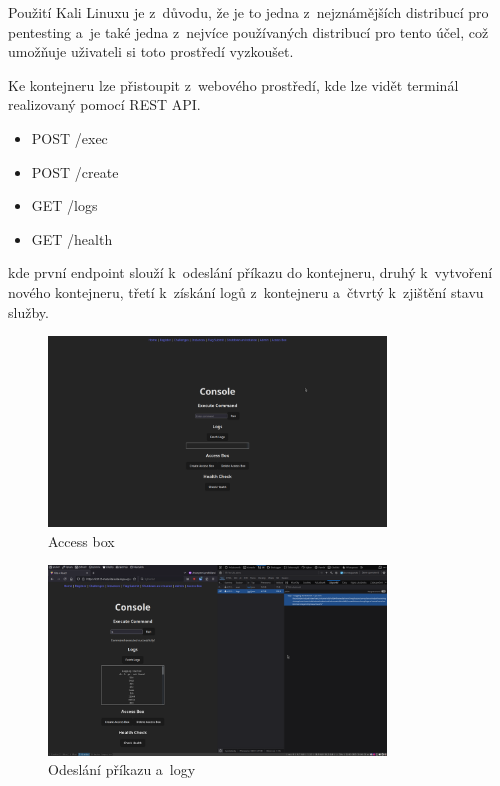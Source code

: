 \documentclass[12pt, a4paper,
oneside,      %
openright
]{report}
\begin{document}
Použití Kali Linuxu je z~důvodu, že je to jedna z~nejznámějších distribucí pro pentesting a~je také jedna z~nejvíce používaných distribucí pro tento účel, což umožňuje uživateli si toto prostředí vyzkoušet.

Ke kontejneru lze přistoupit z~webového prostředí, kde lze vidět terminál realizovaný pomocí REST API.
\begin{itemize}
	\item POST /exec
	\item POST /create
	\item GET /logs
	\item GET /health
\end{itemize}
kde první endpoint slouží k~odeslání příkazu do kontejneru, druhý k~vytvoření nového kontejneru, třetí k~získání logů z~kontejneru a~čtvrtý k~zjištění stavu služby.

\begin{figure}[h]
	\centering
	\includegraphics[width=0.8\textwidth]{08-access.png}
	\caption{Access box}
	\label{fig:frontend-access}
\end{figure}

\begin{figure}[h]
	\centering
	\includegraphics[width=0.8\textwidth]{09-command.png}
	\caption{Odeslání příkazu a~logy}
	\label{fig:frontend-command}
\end{figure}
\end{document}
